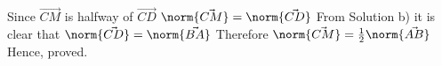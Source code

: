 Since $\vec{CM}$ is halfway of $\vec{CD}$
\newline
$\norm{\vec{CM}}=\norm{\vec{CD}}$
\newline
From Solution b) it is clear that $\norm{\vec{CD}}=\norm{\vec{BA}}$
\newline
Therefore $\norm{\vec{CM}}=\frac{1}{2}\norm{\vec{AB}}$
\\
Hence, proved.
